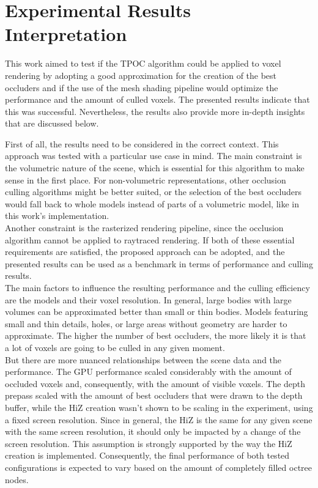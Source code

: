 \section{Experimental Results Interpretation}

This work aimed to test if the \ac{TPOC} algorithm could be applied to voxel rendering by adopting a good approximation 
for the creation of the best occluders and if the use of the mesh shading pipeline would optimize the performance and 
the amount of culled voxels. The presented results indicate that this was successful. Nevertheless, the results also 
provide more in-depth insights that are discussed below. \\
\enlargethispage{\baselineskip}

\noindent
First of all, the results need to be considered in the correct context. This approach was tested with a particular use 
case in mind. The main constraint is the volumetric nature of the scene, which is essential for this algorithm to make 
sense in the first place. For non-volumetric representations, other occlusion culling algorithms might be better suited, 
or the selection of the best occluders would fall back to whole models instead of parts of a volumetric model, like in 
this work's implementation. \\

\noindent
Another constraint is the rasterized rendering pipeline, since the occlusion algorithm cannot be applied to raytraced 
rendering. If both of these essential requirements are satisfied, the proposed approach can be adopted, and the 
presented results can be used as a benchmark in terms of performance and culling results. \\

\noindent
The main factors to influence the resulting performance and the culling efficiency are the models and their voxel 
resolution. In general, large bodies with large volumes can be approximated better than small or thin bodies. Models 
featuring small and thin details, holes, or large areas without geometry are harder to approximate. The higher the 
number of best occluders, the more likely it is that a lot of voxels are going to be culled in any given moment. \\

\noindent
But there are more nuanced relationships between the scene data and the performance. The \ac{GPU} performance scaled 
considerably with the amount of occluded voxels and, consequently, with the amount of visible voxels. The depth prepass 
scaled with the amount of best occluders that were drawn to the depth buffer, while the \ac{HiZ} creation wasn't shown 
to be scaling in the experiment, using a fixed screen resolution. Since in general, the \ac{HiZ} is the same for any 
given scene with the same screen resolution, it should only be impacted by a change of the screen resolution. This 
assumption is strongly supported by the way the \ac{HiZ} creation is implemented. Consequently, the final performance 
of both tested configurations is expected to vary based on the amount of completely filled octree nodes. \\

